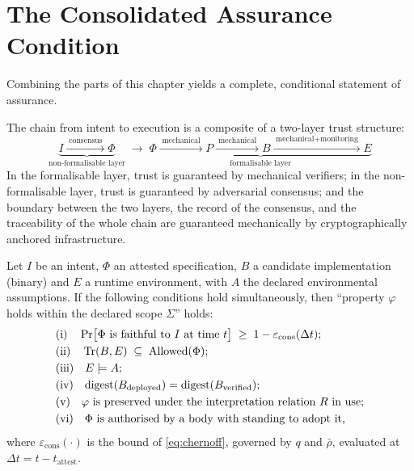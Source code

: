 \section{The Consolidated Assurance Condition}\label{sec:assurance-final}

Combining the parts of this chapter yields a complete, conditional statement of assurance.

\begin{definition}\label{def:two-layer}
The chain from intent to execution is a composite of a two-layer trust structure:
\begin{equation}\label{eq:twolayer}
\underbrace{I \xrightarrow{\;\text{consensus}\;} \Phi}_{\text{non-formalisable layer}}
\;\longrightarrow\;
\underbrace{\Phi \xrightarrow{\;\text{mechanical}\;} P \xrightarrow{\;\text{mechanical}\;} B
\xrightarrow{\;\text{mechanical}+\text{monitoring}\;} E}_{\text{formalisable layer}}
\end{equation}
In the formalisable layer, trust is guaranteed by mechanical verifiers; in the
non-formalisable layer, trust is guaranteed by adversarial consensus; and the boundary
between the two layers, the record of the consensus, and the traceability of the whole chain
are guaranteed mechanically by cryptographically anchored infrastructure.
\end{definition}

\begin{proposition}\label{prop:assurance}
Let $I$ be an intent, $\Phi$ an attested specification, $B$ a candidate implementation
(binary) and $E$ a runtime environment, with $A$ the declared environmental assumptions.
If the following conditions hold simultaneously, then ``property $\varphi$ holds within the
declared scope $\Sigma$'' holds:
\begin{align}
&\text{(i)}\quad \Pr\bigl[\Phi \text{ is faithful to } I \text{ at time } t\bigr] \;\ge\;
1 - \varepsilon_{\text{cons}}(\Delta t);\\
&\text{(ii)}\quad \operatorname{Tr}(B, E) \;\subseteq\; \operatorname{Allowed}(\Phi);\\
&\text{(iii)}\quad E \models A;\\
&\text{(iv)}\quad \mathrm{digest}(B_{\text{deployed}}) = \mathrm{digest}(B_{\text{verified}});\\
&\text{(v)}\quad \varphi \text{ is preserved under the interpretation relation } R \text{ in use};\\
&\text{(vi)}\quad \Phi \text{ is authorised by a body with standing to adopt it,}
\end{align}
where $\varepsilon_{\text{cons}}(\cdot)$ is the bound of \eqref{eq:chernoff}, governed by $q$ and
$\bar\rho$, evaluated at $\Delta t = t - t_{\text{attest}}$.
\end{proposition}

